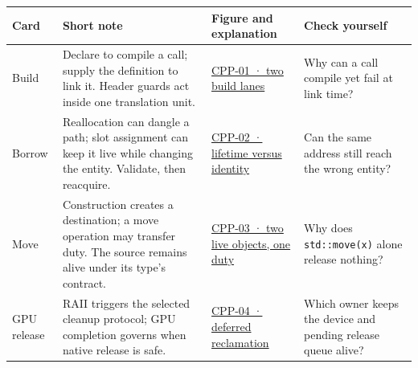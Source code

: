 {\def\LTcaptype{none} %
\begin{longtable}[]{@{}
  >{\raggedright\arraybackslash}p{}
  >{\raggedright\arraybackslash}p{}
  >{\raggedright\arraybackslash}p{}
  >{\raggedright\arraybackslash}p{}@{}}
\toprule\noalign{}
\begin{minipage}[b]{\linewidth}\raggedright
Card
\end{minipage} & \begin{minipage}[b]{\linewidth}\raggedright
Short note
\end{minipage} & \begin{minipage}[b]{\linewidth}\raggedright
Figure and explanation
\end{minipage} & \begin{minipage}[b]{\linewidth}\raggedright
Check yourself
\end{minipage} \\
\midrule\noalign{}
\endhead
\bottomrule\noalign{}
\endlastfoot
Build & Declare to compile a call; supply the definition to link it. Header guards act inside one translation unit. & \href{Continuous\%20Notes/Computing\%20Foundations\%20-\%20From\%20Bits\%20to\%20C++\%20and\%20Systems\%20APIs\#Figure\%20CPP-01\%20-\%20Two\%20build\%20lanes\%20meet\%20at\%20the\%20linker/}{CPP-01 · two build lanes} & Why can a call compile yet fail at link time? \\
Borrow & Reallocation can dangle a path; slot assignment can keep it live while changing the entity. Validate, then reacquire. & \href{Continuous\%20Notes/Computing\%20Foundations\%20-\%20From\%20Bits\%20to\%20C++\%20and\%20Systems\%20APIs\#Figure\%20CPP-02\%20-\%20A\%20borrow\%20can\%20fail\%20in\%20two\%20different\%20ways/}{CPP-02 · lifetime versus identity} & Can the same address still reach the wrong entity? \\
Move & Construction creates a destination; a move operation may transfer duty. The source remains alive under its type's contract. & \href{Continuous\%20Notes/Computing\%20Foundations\%20-\%20From\%20Bits\%20to\%20C++\%20and\%20Systems\%20APIs\#Figure\%20CPP-03\%20-\%20Move\%20the\%20duty,\%20keep\%20both\%20object\%20lifetimes/}{CPP-03 · two live objects, one duty} & Why does \texttt{std::move(x)} alone release nothing? \\
GPU release & RAII triggers the selected cleanup protocol; GPU completion governs when native release is safe. & \href{Continuous\%20Notes/Computing\%20Foundations\%20-\%20From\%20Bits\%20to\%20C++\%20and\%20Systems\%20APIs\#Figure\%20CPP-04\%20-\%20CPU\%20cleanup\%20can\%20precede\%20GPU\%20reclamation/}{CPP-04 · deferred reclamation} & Which owner keeps the device and pending release queue alive? \\
\end{longtable}
}

